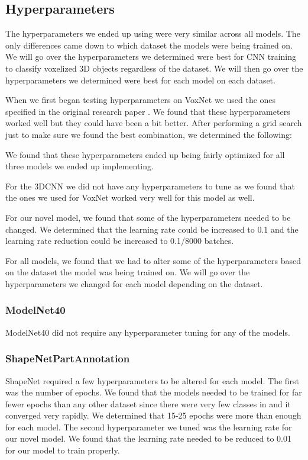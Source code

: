 \documentclass[conference]{IEEEtran}
\begin{document}
\subsection{Hyperparameters}
The hyperparameters we ended up using were very similar across all models. The only differences came down to which dataset the models were being trained on. We will go over the hyperparameters we determined were best for CNN training to classify voxelized 3D objects regardless of the dataset. We will then go over the hyperparameters we determined were best for each model on each dataset.

When we first began testing hyperparameters on VoxNet we used the ones specified in the original research paper \cite{7353481}. We found that these hyperparameters worked well but they could have been a bit better. After performing a grid search just to make sure we found the best combination, we determined the following:

We found that these hyperparameters ended up being fairly optimized for all three models we ended up implementing. 

For the 3DCNN we did not have any hyperparameters to tune as we found that the ones we used for VoxNet worked very well for this model as well.

For our novel model, we found that some of the hyperparameters needed to be changed. We determined that the learning rate could be increased to 0.1 and the learning rate reduction could be increased to 0.1/8000 batches.

For all models, we found that we had to alter some of the hyperparameters based on the dataset the model was being trained on. We will go over the hyperparameters we changed for each model depending on the dataset.

\subsubsection{ModelNet40}
ModelNet40 did not require any hyperparameter tuning for any of the models.

\subsubsection{ShapeNetPartAnnotation}
ShapeNet required a few hyperparameters to be altered for each model. The first was the number of epochs. We found that the models needed to be trained for far fewer epochs than any other dataset since there were very few classes in and it converged very rapidly. We determined that 15-25 epochs were more than enough for each model. The second hyperparameter we tuned was the learning rate for our novel model. We found that the learning rate needed to be reduced to 0.01 for our model to train properly.
\end{document}
